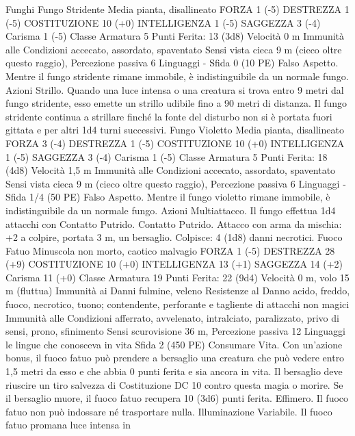 \begin{multicols}{2}
Funghi
Fungo Stridente
Media pianta, disallineato
FORZA 1 (-5)
DESTREZZA 1 (-5)
COSTITUZIONE 10 (+0)
INTELLIGENZA 1 (-5)
SAGGEZZA 3 (-4)
Carisma 1 (-5)
Classe Armatura 5
\hspace*{0pt}\hfill{Punti Ferita}: 13 (3d8)
Velocità 0 m
Immunità alle Condizioni accecato, assordato, spaventato
Sensi vista cieca 9 m (cieco oltre questo raggio), Percezione
passiva 6
Linguaggi -
Sfida 0 (10 PE)
Falso Aspetto. Mentre il fungo stridente rimane immobile, è
indistinguibile da un normale fungo.
Azioni
Strillo. Quando una luce intensa o una creatura si trova entro 9
metri dal fungo stridente, esso emette un strillo udibile fino a 90
metri di distanza. Il fungo stridente continua a strillare finché la
fonte del disturbo non si è portata fuori gittata e per altri 1d4
turni successivi.
Fungo Violetto
Media pianta, disallineato
FORZA 3 (-4)
DESTREZZA 1 (-5)
COSTITUZIONE 10 (+0)
INTELLIGENZA 1 (-5)
SAGGEZZA 3 (-4)
Carisma 1 (-5)
Classe Armatura 5
\hspace*{0pt}\hfill{Punti Ferita}: 18 (4d8)
Velocità 1,5 m
Immunità alle Condizioni accecato, assordato, spaventato
Sensi vista cieca 9 m (cieco oltre questo raggio), Percezione
passiva 6
Linguaggi -
Sfida 1/4 (50 PE)
Falso Aspetto. Mentre il fungo violetto rimane immobile, è
indistinguibile da un normale fungo.
Azioni
Multiattacco. Il fungo effettua 1d4 attacchi con Contatto Putrido.
Contatto Putrido. Attacco con arma da mischia: +2 a colpire,
portata 3 m, un bersaglio.
Colpisce: 4 (1d8) danni necrotici.
Fuoco Fatuo
Minuscola non morto, caotico malvagio
FORZA 1 (-5)
DESTREZZA 28 (+9)
COSTITUZIONE 10 (+0)
INTELLIGENZA 13 (+1)
SAGGEZZA 14 (+2)
Carisma 11 (+0)
Classe Armatura 19
\hspace*{0pt}\hfill{Punti Ferita}: 22 (9d4)
Velocità 0 m, volo 15 m (fluttua)
Immunità ai Danni fulmine, veleno
Resistenze al Danno acido, freddo, fuoco, necrotico, tuono;
contendente, perforante e tagliente di attacchi non magici
Immunità alle Condizioni afferrato, avvelenato, intralciato,
paralizzato, privo di sensi, prono, sfinimento
Sensi scurovisione 36 m, Percezione passiva 12
Linguaggi le lingue che conosceva in vita
Sfida 2 (450 PE)
Consumare Vita. Con un’azione bonus, il fuoco fatuo può
prendere a bersaglio una creatura che può vedere entro 1,5 metri
da esso e che abbia 0 punti ferita e sia ancora in vita. Il bersaglio
deve riuscire un tiro salvezza di Costituzione DC 10 contro
questa magia o morire. Se il bersaglio muore, il fuoco fatuo
recupera 10 (3d6) punti ferita.
Effimero. Il fuoco fatuo non può indossare né trasportare nulla.
Illuminazione Variabile. Il fuoco fatuo promana luce intensa in

\end{multicols}

